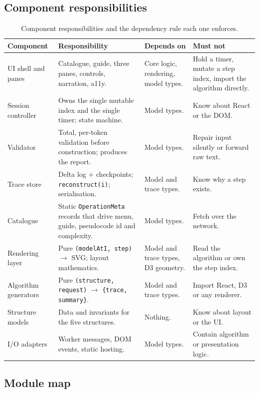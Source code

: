 \documentclass[11pt,a4paper]{article}
\newcommand{\ct}[1]{\texttt{#1}}
\begin{document}
\subsection{Component responsibilities}

\begin{table}[H]
\centering
\small
\setlength{\tabcolsep}{4pt}
\begin{tabular}{@{}L{3.0cm}L{4.8cm}L{4.3cm}L{3.1cm}@{}}
\toprule
\textbf{Component} & \textbf{Responsibility} & \textbf{Depends on} & \textbf{Must not} \\
\midrule
UI shell and panes & Catalogue, guide, three panes, controls, narration, a11y. &
Core logic, rendering, model types. & Hold a timer, mutate a step index, import the algorithm
directly. \\
Session controller & Owns the single mutable index and the single timer; state machine. &
Model types. & Know about React or the DOM. \\
Validator & Total, per-token validation before construction; produces the report. &
Model types. & Repair input silently or forward raw text. \\
Trace store & Delta log + checkpoints; \ct{reconstruct(i)}; serialisation. &
Model and trace types. & Know why a step exists. \\
Catalogue & Static \ct{OperationMeta} records that drive menu, guide, pseudocode id and complexity. &
Model types. & Fetch over the network. \\
Rendering layer & Pure \ct{(modelAtI, step)} $\to$ SVG; layout mathematics. &
Model and trace types, D3 geometry. & Read the algorithm or own the step index. \\
Algorithm generators & Pure \ct{(structure, request)} $\to$ \ct{\{trace, summary\}}. &
Model and trace types. & Import React, D3 or any renderer. \\
Structure models & Data and invariants for the five structures. & Nothing. & Know about layout or
the UI. \\
I/O adapters & Worker messages, DOM events, static hosting. & Model types. & Contain algorithm or
presentation logic. \\
\bottomrule
\end{tabular}
\caption{Component responsibilities and the dependency rule each one enforces.}
\end{table}

\subsection{Module map}
\end{document}
